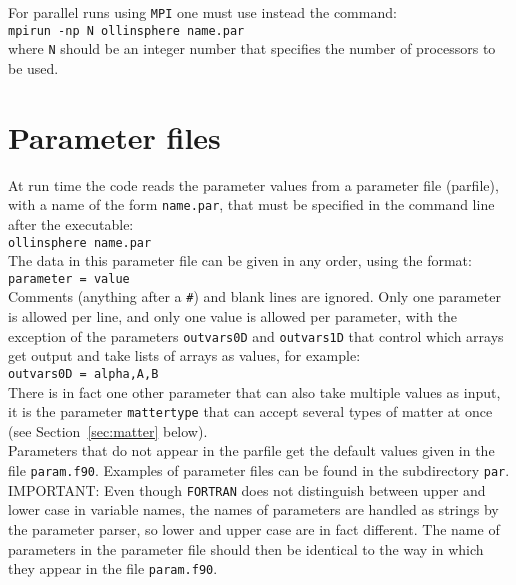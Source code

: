\documentclass[12pt]{article}
\begin{document}
For parallel runs using \texttt{MPI} one must use instead the command:
\\

\texttt{mpirun -np N ollinsphere name.par} \\

where \texttt{N} should be an integer number that specifies the number
of processors to be used. \\



\section{Parameter files}
\label{sec:parfiles}

At run time the code reads the parameter values from a parameter file
(parfile), with a name of the form \texttt{name.par}, that must be
specified in the command line after the executable: \\

\texttt{ollinsphere  name.par} \\

The data in this parameter file can be given in any order, using the
format: \\

\texttt{parameter = value} \\

Comments (anything after a \texttt{\#}) and blank lines are ignored.
Only one parameter is allowed per line, and only one value is allowed
per parameter, with the exception of the parameters \texttt{outvars0D}
and \texttt{outvars1D} that control which arrays get output and take
lists of arrays as values, for example: \\

\texttt{outvars0D = alpha,A,B} \\

There is in fact one other parameter that can also take multiple
values as input, it is the parameter \texttt{mattertype} that can
accept several types of matter at once (see Section~\ref{sec:matter}
below).\\

Parameters that do not appear in the parfile get the default values
given in the file \texttt{param.f90}.  Examples of parameter files can
be found in the subdirectory \texttt{par}. \\

IMPORTANT: Even though \texttt{FORTRAN} does not distinguish between
upper and lower case in variable names, the names of parameters are
handled as strings by the parameter parser, so lower and upper case
are in fact different.  The name of parameters in the parameter file
should then be identical to the way in which they appear in the file
\texttt{param.f90}. \\
\end{document}
